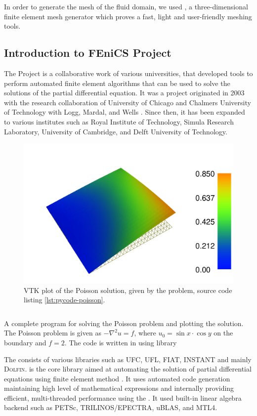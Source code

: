 In order to generate the mesh of the fluid domain, we used \gmsh, a three-dimensional finite element mesh generator which proves a fast, light and user-friendly meshing tools.

\subsection{Introduction to FEniCS Project}

The \fenics Project is a collaborative work of various universities, that developed tools to perform automated finite element algorithms that can be used to solve the solutions of the partial differential equation. It was a project originated in 2003 with the research collaboration of University of Chicago and Chalmers University of Technology with Logg,  Mardal, and Wells \cite{Logg2012b}. Since then, it has been expanded to various institutes such as Royal Institute of Technology, Simula Research Laboratory, University of Cambridge, and Delft University of Technology.

	\begin{figure}[p]
	\centering
	\includegraphics[width=0.5\linewidth]{./figures/eulerian/dolfinExampleFigure-rotated270.pdf}
	\caption{\dolfin VTK plot of the Poisson solution, given by the problem, source code listing \ref{lst:pycode-poisson}.}
	\label{fig:dolfinExampleFigure}
	\end{figure}

	\begin{listing}[p]
	\inputminted[fontseries=courier,obeytabs,fontsize=\footnotesize,mathescape,linenos,numbersep=5pt,frame=lines,framesep=2mm,xleftmargin=20mm,xrightmargin=20mm]{python}{figures/eulerian/dolfinExample.py}
	\caption{A complete program for solving the Poisson problem and plotting the solution. The Poisson problem is given as $-\nabla^2{u} = f$, where $u_0 = \sin{x}\cdot\cos{y}$ on the boundary and $f=2$. The code is written in \python using  library}
	\label{lst:pycode-poisson}
	\end{listing}

The consists of various libraries such as UFC, UFL, FIAT, INSTANT and mainly \textsc{Dolfin}. \dolfin is the core library aimed at automating the solution of partial differential equations using finite element method \cite{Logg2010a}. It uses automated code generation maintaining high level of mathematical expressions and internally providing efficient, multi-threaded performance using the . It used built-in linear algebra backend such as PETSc, TRILINOS/EPECTRA, uBLAS, and MTL4.

